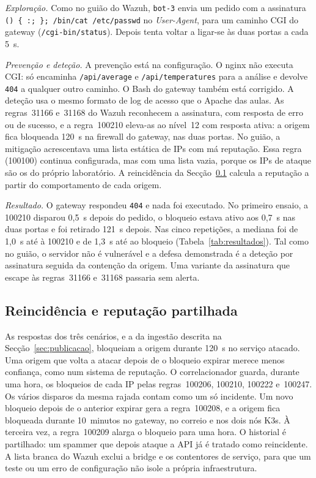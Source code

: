 \documentclass[conference,a4paper]{IEEEtran}
\newcommand{\code}[1]{\texttt{\small #1}}
\begin{document}
\emph{Exploração.} Como no guião do Wazuh, \code{bot-3} envia um pedido com a assinatura \code{() \{ :; \}; /bin/cat /etc/passwd} no \emph{User-Agent}, para um caminho CGI do gateway (\code{/cgi-bin/status}). Depois tenta voltar a ligar-se às duas portas a cada 5~s.

\emph{Prevenção e deteção.} A prevenção está na configuração. O nginx não executa CGI: só encaminha \code{/api/average} e \code{/api/temperatures} para a análise e devolve \code{404} a qualquer outro caminho. O Bash do gateway também está corrigido. A deteção usa o mesmo formato de log de acesso que o Apache das aulas. As regras~31166 e~31168 do Wazuh reconhecem a assinatura, com resposta de erro ou de sucesso, e a regra~100210 eleva-as ao nível~12 com resposta ativa: a origem fica bloqueada 120~s na firewall do gateway, nas duas portas. No guião, a mitigação acrescentava uma lista estática de IPs com má reputação. Essa regra (100100) continua configurada, mas com uma lista vazia, porque os IPs de ataque são os do próprio laboratório. A reincidência da Secção~\ref{sec:reputacao} calcula a reputação a partir do comportamento de cada origem.

\emph{Resultado.} O gateway respondeu \code{404} e nada foi executado. No primeiro ensaio, a 100210 disparou 0,5~s depois do pedido, o bloqueio estava ativo aos 0,7~s nas duas portas e foi retirado 121~s depois. Nas cinco repetições, a mediana foi de 1,0~s até à 100210 e de 1,3~s até ao bloqueio (Tabela~\ref{tab:resultados}). Tal como no guião, o servidor não é vulnerável e a defesa demonstrada é a deteção por assinatura seguida da contenção da origem. Uma variante da assinatura que escape às regras~31166 e~31168 passaria sem alerta.

\subsection{Reincidência e reputação partilhada}\label{sec:reputacao}
As respostas dos três cenários, e a da ingestão descrita na Secção~\ref{sec:publicacao}, bloqueiam a origem durante 120~s no serviço atacado. Uma origem que volta a atacar depois de o bloqueio expirar merece menos confiança, como num sistema de reputação. O correlacionador guarda, durante uma hora, os bloqueios de cada IP pelas regras~100206, 100210, 100222 e~100247. Os vários disparos da mesma rajada contam como um só incidente. Um novo bloqueio depois de o anterior expirar gera a regra~100208, e a origem fica bloqueada durante 10~minutos no gateway, no correio e nos dois nós K3s. À terceira vez, a regra~100209 alarga o bloqueio para uma hora. O historial é partilhado: um spammer que depois ataque a API já é tratado como reincidente. A lista branca do Wazuh exclui a bridge e os contentores de serviço, para que um teste ou um erro de configuração não isole a própria infraestrutura.
\end{document}

